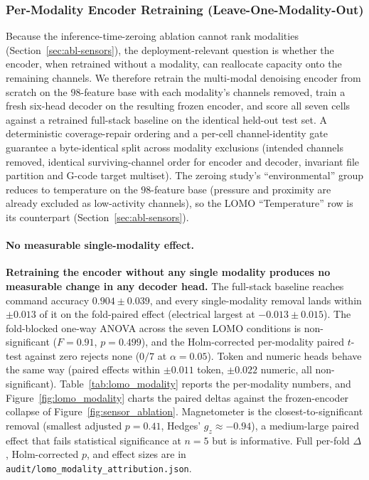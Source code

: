 \documentclass[sensors,article,submit,moreauthors,pdftex]{Definitions/mdpi}
\begin{document}
\subsubsection{Per-Modality Encoder Retraining (Leave-One-Modality-Out)}
\label{sec:abl-lomo}

Because the inference-time-zeroing ablation cannot rank modalities (Section~\ref{sec:abl-sensors}), the deployment-relevant question is whether the encoder, when retrained without a modality, can reallocate capacity onto the remaining channels. We therefore retrain the multi-modal denoising encoder from scratch on the $98$-feature base with each modality's channels removed, train a fresh six-head decoder on the resulting frozen encoder, and score all seven cells against a retrained full-stack baseline on the identical held-out test set. A deterministic coverage-repair ordering and a per-cell channel-identity gate guarantee a byte-identical split across modality exclusions (intended channels removed, identical surviving-channel order for encoder and decoder, invariant file partition and G-code target multiset). The zeroing study's ``environmental'' group reduces to temperature on the $98$-feature base (pressure and proximity are already excluded as low-activity channels), so the LOMO ``Temperature'' row is its counterpart (Section~\ref{sec:abl-sensors}).

\paragraph{No measurable single-modality effect.} \textbf{Retraining the encoder without any single modality produces no measurable change in any decoder head.} The full-stack baseline reaches command accuracy $0.904 \pm 0.039$, and every single-modality removal lands within $\pm 0.013$ of it on the fold-paired effect (electrical largest at $-0.013 \pm 0.015$). The fold-blocked one-way ANOVA across the seven LOMO conditions is non-significant ($F=0.91$, $p=0.499$), and the Holm-corrected per-modality paired $t$-test against zero rejects none ($0/7$ at $\alpha=0.05$). Token and numeric heads behave the same way (paired effects within $\pm 0.011$ token, $\pm 0.022$ numeric, all non-significant). Table~\ref{tab:lomo_modality} reports the per-modality numbers, and Figure~\ref{fig:lomo_modality} charts the paired deltas against the frozen-encoder collapse of Figure~\ref{fig:sensor_ablation}. Magnetometer is the closest-to-significant removal (smallest adjusted $p=0.41$, Hedges' $g_z \approx -0.94$), a medium-large paired effect that fails statistical significance at $n\!=\!5$ but is informative. Full per-fold $\Delta$, Holm-corrected $p$, and effect sizes are in \texttt{audit/lomo\_modality\_attribution.json}.
\end{document}
